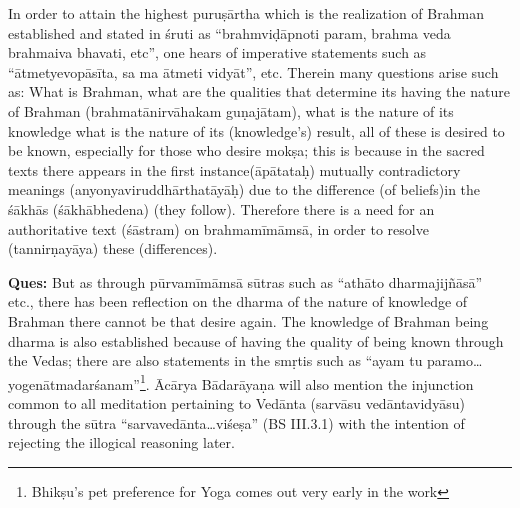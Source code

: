 In order to attain the highest puruṣārtha which is the realization of Brahman established and stated in śruti as ``brahmviḍāpnoti param, brahma veda brahmaiva bhavati, etc'', one hears of imperative statements such as ``ātmetyevopā\-sīta, sa ma ātmeti vidyāt'', etc. Therein many questions arise such as: What is Brahman, what are the qualities that  determine its having the nature of Brahman (brahmatā\-nirvā\-hakam guṇajātam), what is the nature of its knowledge what is the nature of its (knowledge's) result, all of these is desired to be known, especially for those who desire mokṣa; this is because in the sacred texts there appears in the first instance(āpātataḥ) mutually contradictory meanings (anyonyaviruddhārthatāyāḥ) due to the difference (of beliefs)in the śākhās (śākhābhedena) (they follow). Therefore there is a need for an authoritative text (śāstram) on brahmamīmāmsā, in order to resolve (tannirṇayāya) these (differences).


       

\textbf{Ques:} But as through pūrvamīmāmsā sūtras such as “athāto dharmajijñāsā” etc., there has been reflection on the dharma of the nature of knowledge of Brahman there cannot be that desire again. The know\-ledge of Brahman being dharma is also established because of having the quality of being known through the Vedas; there are also statements in the smṛtis such as “ayam tu paramo…yogenātmadarśanam”\footnote{Bhikṣu’s pet preference for Yoga comes out very early in the work}. Ācārya Bādarāyaṇa will also mention the injunction common to all meditation pertaining to Vedānta (sarvāsu vedāntavidyāsu) through the sūtra “sarvavedānta…viśeṣa” (BS III.3.1) with the intention of rejecting the illogical reasoning later.


